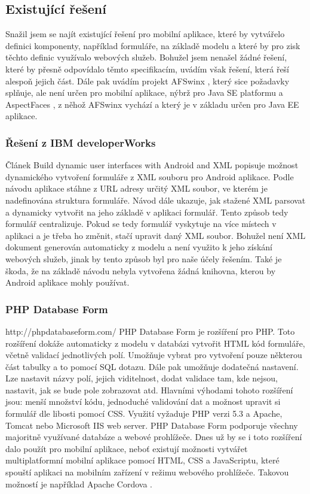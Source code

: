 \subsection{Existující řešení}
Snažil jsem se najít existující řešení pro mobilní aplikace, které by vytvářelo definici komponenty, například formuláře, na základě modelu a které by pro zisk těchto definic využívalo webových služeb. Bohužel jsem nenašel žádné řešení, které by přesně odpovídalo těmto specifikacím, uvádím však řešení, která řeší alespoň jejich část. Dále pak uvádím projekt AFSwinx \cite{citation-needed}, který sice požadavky splňuje, ale není určen pro mobilní aplikace, nýbrž pro Java SE platformu a AspectFaces \cite{aspect-faces} , z něhož AFSwinx vychází a který je v základu určen pro Java EE aplikace.

\subsubsection{Řešení z IBM developerWorks}
Článek Build dynamic user interfaces with Android and XML \cite{dynamic-android-xml} popisuje možnost dynamického vytvoření formuláře z XML souboru pro Android aplikace. Podle návodu aplikace stáhne z URL adresy určitý XML soubor, ve kterém je nadefinována struktura formuláře. Návod dále ukazuje, jak stažené XML parsovat a dynamicky vytvořit na jeho základě v aplikaci formulář. Tento způsob tedy formulář centralizuje. Pokud se tedy formulář vyskytuje na více místech v aplikaci a je třeba ho změnit, stačí upravit daný XML soubor. Bohužel není XML dokument generován automaticky z modelu a není využito k jeho získání webových služeb, jinak by tento způsob byl pro naše účely řešením. Také je škoda, že na základě návodu nebyla vytvořena žádná knihovna, kterou by Android aplikace mohly používat.

\subsubsection{PHP Database Form}
http://phpdatabaseform.com/
PHP Database Form je rozšíření pro PHP. Toto rozšíření dokáže automaticky z modelu v databázi vytvořit HTML kód formuláře, včetně validací jednotlivých polí. Umožňuje vybrat pro vytvoření pouze některou část tabulky a to pomocí SQL dotazu. Dále pak umožňuje dodatečná nastavení. Lze nastavit názvy polí, jejich viditelnost, dodat validace tam, kde nejsou, nastavit, jak se bude pole zobrazovat atd. Hlavními výhodami tohoto rozšíření jsou: menší množství kódu, jednoduché validování dat a možnost upravit si formulář dle libosti pomocí CSS. Využití vyžaduje PHP verzi 5.3 a Apache, Tomcat nebo Microsoft IIS web server. PHP Database Form podporuje všechny majoritně využívané databáze a webové prohlížeče. Dnes už by se i toto rozšíření dalo použít pro mobilní aplikace, neboť existují možnosti vytvářet multiplatformní mobilní aplikace pomocí HTML, CSS a JavaScriptu, které spouští aplikaci na mobilním zařízení v režimu webového prohlížeče. Takovou možností je například Apache Cordova \cite{apache-cordova}.

